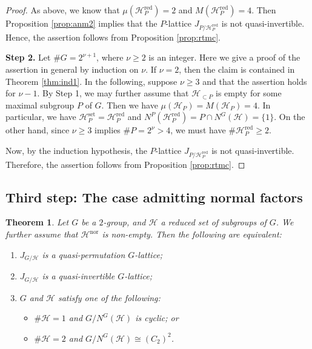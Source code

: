 \documentclass[12pt]{amsart}
\theoremstyle{plain}
\newtheorem{thm}{Theorem}[section]
\theoremstyle{definition}
\numberwithin{thm}{section}
\numberwithin{equation}{section}
\newcommand{\cH}{\mathcal{H}}
\DeclareMathOperator{\red}{red}
\DeclareMathOperator{\nor}{nor}
\DeclareMathOperator{\set}{set}
\begin{document}
\begin{proof}
As above, we know that $\mu(\cH_{P}^{\red})=2$ and $M(\cH_{P}^{\red})=4$. Then Proposition \ref{prop:anm2} implies that the $P$-lattice $J_{P/\cH_{P}^{\red}}$ is not quasi-invertible. Hence, the assertion follows from Proposition \ref{prop:rtmc}. %

\textbf{Step 2. }Let $\#G=2^{\nu+1}$, where $\nu \geq 2$ is an integer. Here we give a proof of the assertion in general by induction on $\nu$. If $\nu=2$, then the claim is contained in Theorem \ref{thm:ind1}. In the following, suppose $\nu \geq 3$ and that the assertion holds for $\nu-1$. By Step 1, we may further assume that $\cH_{\subset P}$ is empty for some maximal subgroup $P$ of $G$. Then we have $\mu(\cH_{P})=M(\cH_{P})=4$. In particular, we have $\cH_{P}^{\set}=\cH_{P}^{\red}$ and $N^{P}(\cH_{P}^{\red})=P\cap N^{G}(\cH)=\{1\}$. On the other hand, since $\nu \geq 3$ implies $\#P=2^{\nu}>4$, we must have $\#\cH_{P}^{\red}\geq 2$. 

Now, by the induction hypothesis, the $P$-lattice $J_{P/\cH_{P}^{\red}}$ is not quasi-invertible. Therefore, the assertion follows from Proposition \ref{prop:rtmc}. %
\end{proof}

\subsection{Third step: The case admitting normal factors}

\begin{thm}\label{thm:ndq2}
Let $G$ be a $2$-group, and $\cH$ a reduced set of subgroups of $G$. We further assume that $\cH^{\nor}$ is non-empty. Then the following are equivalent: 
\begin{enumerate}
\item $J_{G/\cH}$ is a quasi-permutation $G$-lattice; 
\item $J_{G/\cH}$ is a quasi-invertible $G$-lattice; 
\item $G$ and $\cH$ satisfy one of the following: 
\begin{itemize}
    \item[(iii-1)] $\#\cH=1$ and $G/N^{G}(\cH)$ is cyclic; or
    \item[(iii-2)] $\#\cH=2$ and $G/N^{G}(\cH)\cong (C_{2})^{2}$. 
\end{itemize}
\end{enumerate}
\end{thm}
\end{document}
